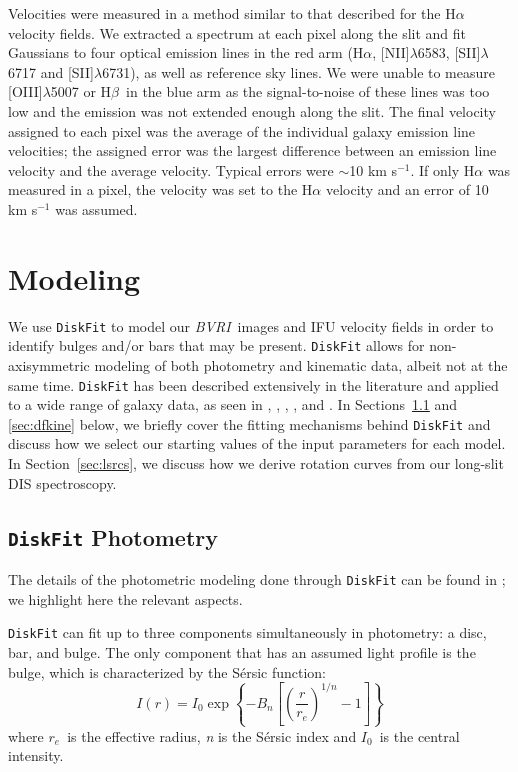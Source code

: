 \documentclass[a4paper,fleqn,usenatbib]{mnras}
\begin{document}
Velocities were measured in a method similar to that described for the H$\alpha$ velocity fields. We extracted a spectrum at each pixel along the slit and fit Gaussians to four optical emission lines in the red arm (H$\alpha$, [NII]$\lambda$6583, [SII]$\lambda$6717 and [SII]$\lambda$6731), as well as reference sky lines. We were unable to measure [OIII]$\lambda$5007 or H$\beta$\ in the blue arm as the signal-to-noise of these lines was too low and the emission was not extended enough along the slit. The final velocity assigned to each pixel was the average of the individual galaxy emission line velocities;  the assigned error was the largest difference between an emission line velocity and the average velocity. Typical errors were $\sim$10 km s$^{-1}$.  If only H$\alpha$ was measured in a pixel, the velocity was set to the H$\alpha$ velocity and an error of 10 km s$^{-1}$ was assumed. 

\section{Modeling}
\label{sec:modeling}

We use \texttt{DiskFit} to model our \textit{BVRI}\ images and IFU velocity fields in order to identify bulges and/or bars that may be present. \texttt{DiskFit} allows for non-axisymmetric modeling of both photometry and kinematic data, albeit not at the same time. \texttt{DiskFit} has been described extensively in the literature and applied to a wide range of galaxy data, as seen in \citet{reese2007}, \citet{spekkens2007}, \citet{sellwood2010}, \citet{kuzio2012}, and \citet{holmes2015}. In Sections~\ref{sec:dfphot} and \ref{sec:dfkine} below, we briefly cover the fitting mechanisms behind \texttt{DiskFit} and discuss how we select our starting values of the input parameters for each model. In Section~\ref{sec:lsrcs}, we discuss how we derive rotation curves from our long-slit DIS spectroscopy.

\subsection{\texttt{DiskFit} Photometry}
\label{sec:dfphot}

The details of the photometric modeling done through \texttt{DiskFit} can be found in \citet{reese2007}; we highlight here the relevant aspects. 

\texttt{DiskFit} can fit up to three components simultaneously in photometry: a disc, bar, and bulge.  The only component that has an assumed light profile is the bulge, which is characterized by the S\'{e}rsic function:
\begin{equation}
I(r) = I_{0}\exp{ \left\{ -B_{n} \left[ \left( \frac{r}{r_{e}} \right) ^{1/n} - 1 \right] \right\} }
\end{equation}
where $r_{e}$\ is the effective radius, \textit{n} is the S\'{e}rsic index and $I_{0}$\ is the central intensity. 
\end{document}
